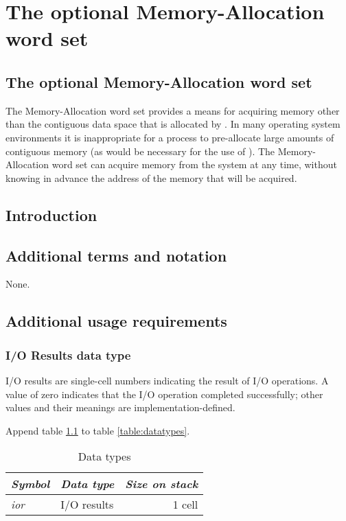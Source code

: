 \chapter{The optional Memory-Allocation word set} %

\begin{intro}
\section{The optional Memory-Allocation word set} %

The Memory-Allocation word set provides a means for acquiring memory
other than the contiguous data space that is allocated by
. In many operating system environments it is
inappropriate for a process to pre-allocate large amounts of contiguous
memory (as would be necessary for the use of ). The
Memory-Allocation word set can acquire memory from the system at any
time, without knowing in advance the address of the memory that will
be acquired.
\end{intro}

\section{Introduction} %

\section{Additional terms and notation} %
None.

\section{Additional usage requirements} %

\subsection{I/O Results data type} %
\label{mem:ior}

I/O results are single-cell numbers indicating the result of I/O
operations. A value of zero indicates that the I/O operation
completed successfully; other values and their meanings are
implementation-defined.

Append table \ref{mem:types} to table \ref{table:datatypes}.

\begin{table}[h]
  \begin{center}
	\caption{Data types}
	\label{mem:types}
	\begin{tabular}{llr}
	\hline\hline
	\emph{Symbol} & \emph{Data type} & \emph{Size on stack} \\
	\hline
	\emph{ior}		& I/O results			& 1 cell \\
	\hline\hline
	\end{tabular}
  \end{center}
\end{table}


